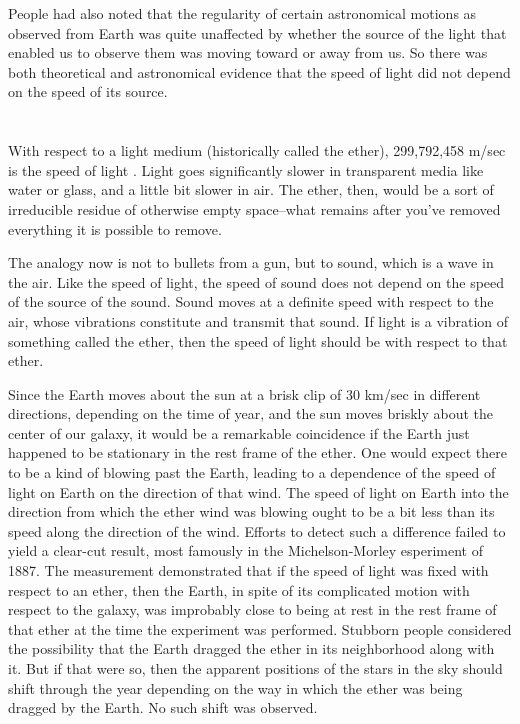 People had also noted that the regularity of certain astronomical motions as observed from Earth was quite unaffected by whether the source of the light that enabled us to observe them was moving toward or away from us. So there was both theoretical and astronomical evidence that the speed of light did not depend on the speed of its source. 
\\\\\\

With respect to a light medium (historically called the ether), 299,792,458 m/sec is the speed of light . Light goes significantly slower in transparent media like water or glass, and a little bit slower in air. The ether, then, would be a sort of irreducible residue of otherwise empty space--what remains after you've removed everything it is possible to remove.

The analogy now is not to bullets from a gun, but to sound, which is a wave in the air. Like the speed of light, the speed of sound does not depend on the speed of the source of the sound. Sound moves at a definite speed with respect to the air, whose vibrations constitute and transmit that sound. If light is a vibration of something called the ether, then the speed of light should be with respect to that ether. 

Since the Earth moves about the sun at a brisk clip of 30 km/sec in different directions, depending on the time of year, and the sun moves briskly about the center of our galaxy, it would be a remarkable coincidence if the Earth just happened to be stationary in the rest frame of the ether. One would expect there to be a kind of  blowing past the Earth, leading to a dependence of the speed of light on Earth on the direction of that wind. The speed of light on Earth into the direction from which the ether wind was blowing ought to be a bit less than its speed along the direction of the wind. Efforts to detect such a difference failed to yield a clear-cut result, most famously in the Michelson-Morley esperiment of 1887. The measurement demonstrated that if the speed of light was fixed with respect to an ether, then the Earth, in spite of its complicated motion with respect to the galaxy, was improbably close to being at rest in the rest frame of that ether at the time the experiment was performed. Stubborn people considered the possibility that the Earth dragged the ether in its neighborhood along with it. But if that were so, then the apparent positions of the stars in the sky should shift through the year depending on the way in which the ether was being dragged by the Earth. No such shift was observed. 

